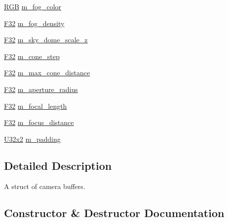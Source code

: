 \begin{DoxyCompactItemize}
\mbox{\hyperlink{structmage_1_1_r_g_b}{R\+GB}} \mbox{\hyperlink{structmage_1_1rendering_1_1_camera_buffer_a6f963e7d607c59ab0dfc3972e06a9739}{m\+\_\+fog\+\_\+color}}
\item 
\mbox{\hyperlink{namespacemage_aa97e833b45f06d60a0a9c4fc22ae02c0}{F32}} \mbox{\hyperlink{structmage_1_1rendering_1_1_camera_buffer_aa9c3a305adfbeb717d480e822ed1c77e}{m\+\_\+fog\+\_\+density}}
\item 
\mbox{\hyperlink{namespacemage_aa97e833b45f06d60a0a9c4fc22ae02c0}{F32}} \mbox{\hyperlink{structmage_1_1rendering_1_1_camera_buffer_abfb4dbb9a228b6a7412b09b179fd157d}{m\+\_\+sky\+\_\+dome\+\_\+scale\+\_\+z}}
\item 
\mbox{\hyperlink{namespacemage_aa97e833b45f06d60a0a9c4fc22ae02c0}{F32}} \mbox{\hyperlink{structmage_1_1rendering_1_1_camera_buffer_a5c52e867f42818ca71cbc7d593d49adf}{m\+\_\+cone\+\_\+step}}
\item 
\mbox{\hyperlink{namespacemage_aa97e833b45f06d60a0a9c4fc22ae02c0}{F32}} \mbox{\hyperlink{structmage_1_1rendering_1_1_camera_buffer_a99515c320feafb88a2d2fdf24520975d}{m\+\_\+max\+\_\+cone\+\_\+distance}}
\item 
\mbox{\hyperlink{namespacemage_aa97e833b45f06d60a0a9c4fc22ae02c0}{F32}} \mbox{\hyperlink{structmage_1_1rendering_1_1_camera_buffer_a65ebdf1e7e9dad21cf4a6ef471a44528}{m\+\_\+aperture\+\_\+radius}}
\item 
\mbox{\hyperlink{namespacemage_aa97e833b45f06d60a0a9c4fc22ae02c0}{F32}} \mbox{\hyperlink{structmage_1_1rendering_1_1_camera_buffer_a7ed5079582d476597f8bc4d6a0b3f372}{m\+\_\+focal\+\_\+length}}
\item 
\mbox{\hyperlink{namespacemage_aa97e833b45f06d60a0a9c4fc22ae02c0}{F32}} \mbox{\hyperlink{structmage_1_1rendering_1_1_camera_buffer_ac483a3656006290880c1ac9e1039e33e}{m\+\_\+focus\+\_\+distance}}
\item 
\mbox{\hyperlink{namespacemage_a31f2bb52b5080e706e1c13de07c0a249}{U32x2}} \mbox{\hyperlink{structmage_1_1rendering_1_1_camera_buffer_ac3d41b35c2d2fc4174841f78d3b05a0d}{m\+\_\+padding}}
\end{DoxyCompactItemize}


\subsection{Detailed Description}
A struct of camera buffers. 

\subsection{Constructor \& Destructor Documentation}
\mbox{\label{structmage_1_1rendering_1_1_camera_buffer_a751c2923a5deb710d7c3957f04c89fcf}} 
